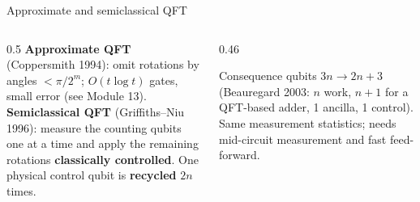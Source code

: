 \documentclass[aspectratio=169,11pt]{beamer}
\newcommand{\hl}[1]{{\color{qorange}\textbf{#1}}}
\newcommand{\key}[1]{{\color{qdark}\textbf{#1}}}
\begin{document}
\begin{frame}[label=fSemiclassical]{Approximate and semiclassical QFT}
  \begin{columns}[T]
    \begin{column}{0.5\textwidth}
      \small
      \key{Approximate QFT} (Coppersmith 1994): omit rotations by angles $< \pi/2^m$; $O(t\log t)$ gates, small error (see Module 13).\\[4pt]
      \key{Semiclassical QFT} (Griffiths--Niu 1996): measure the counting qubits one at a time and apply the remaining rotations \hl{classically controlled}.
      One physical control qubit is \key{recycled} $2n$ times.
    \end{column}
    \begin{column}{0.46\textwidth}
      \begin{block}{Consequence}
        \small qubits $3n \to 2n + 3$ (Beauregard 2003: $n$ work, $n + 1$ for a QFT-based adder, 1 ancilla, 1 control). Same measurement statistics;
        needs mid-circuit measurement and fast feed-forward.
      \end{block}
    \end{column}
  \end{columns}
\end{frame}
\end{document}
